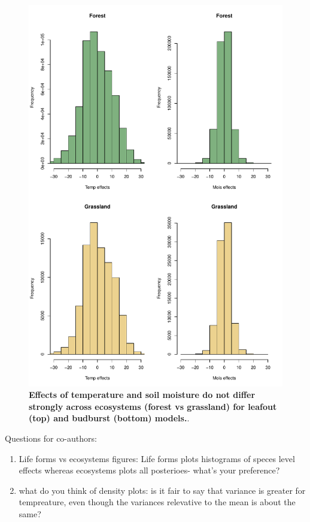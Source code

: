 \documentclass{article}
\begin{document}
 \begin{figure}[h]
\centering
 \includegraphics{../../Analyses/soilmoisture/figures/histloecos.pdf}
 \caption{\textbf{Effects of temperature and soil moisture do not differ strongly across ecosystems (forest vs grassland) for leafout (top) and budburst (bottom) models.}.}
 \label{fig:forms}
 \end{figure}
 
 Questions for co-authors:
 \begin{enumerate}
 \item Life forms vs ecosystems figures: Life forms plots histograms of speces level effects whereas ecosystems plots all posterioes- what's your preference?
 \item what do you think of density plots: is it fair to say that variance is greater for tempreature, even though the variances relevative to the mean is about the same?
 \end{enumerate}
\end{document}
